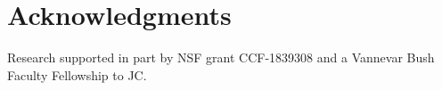 
\section*{Acknowledgments}

Research supported in part by NSF grant CCF-1839308 and a 
Vannevar Bush Faculty Fellowship to JC.
